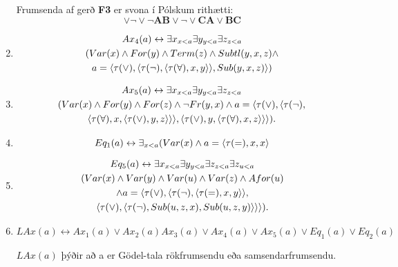 \documentclass[12pt]{book}
\newcommand{\bA}{\mathbf{A}}
\newcommand{\bB}{\mathbf{B}}
\newcommand{\bC}{\mathbf{C}}
\begin{document}
\begin{enumerate}[(1)]
\begin{ath}
  Frumsenda af gerð \textbf{F3} er svona í Pólskum rithætti:
   \[ \vee \lnot \vee \lnot \bA \bB \vee \lnot \vee \bC \bA \vee \bB \bC \]
\end{ath}


\item 
  \begin{gather*}
    Ax_4(a) \leftrightarrow \exists x_{x < a} \exists y_{y < a} \exists z_{z < a}\\
    ( Var(x) \wedge For(y) \wedge Term(z) \wedge Subtl(y,x,z) \wedge\\
    a = \langle\tau(\vee),\langle\tau(\lnot), \langle \tau(\forall),x,y\rangle\rangle, Sub(y,x,z)\rangle
    )
\end{gather*}

\item 
  \begin{gather*}
    Ax_5(a) \leftrightarrow \exists x_{x < a} \exists y_{y < a} \exists z_{z < a}\\
    ( Var(x) \wedge For(y) \wedge For(z) \wedge \lnot Fr(y,x) 
    \wedge a = \langle\tau(\vee), \langle\tau(\lnot),\\
        \langle\tau(\forall),x, \langle\tau(\vee),y,z\rangle\rangle\rangle, \langle\tau(\vee),y, \langle\tau(\forall),x,z\rangle\rangle\rangle).
\end{gather*}

\item  
\[ Eq_1(a) \leftrightarrow \exists_{x < a} (Var(x) \wedge a = \langle\tau(=),x,x\rangle \]

\item 
  \begin{gather*}
    Eq_5(a) \leftrightarrow \exists x_{x < a} \exists y_{y < a} \exists z_{z < a} \exists z_{u < a}\\
    (Var(x) \wedge Var(y) \wedge Var(u) \wedge Var(z) \wedge Afor(u) \\
    \wedge a = \langle\tau(\vee),\langle\tau(\lnot),\langle\tau(=),x,y\rangle\rangle,\\
      \langle\tau(\vee), \langle\tau(\lnot),Sub(u,z,x),Sub(u,z,y)\rangle\rangle\rangle).
  \end{gather*}



\item 

\[LAx(a) \leftrightarrow Ax_1(a) \vee Ax_2(a)  Ax_3(a) \vee Ax_4(a) \vee Ax_5(a) \vee Eq_1(a) \vee Eq_2(a) \]

\begin{ath}
  $LAx(a)$ þýðir að a er Gödel-tala rökfrumsendu eða samsendarfrumsendu.


\end{ath}
\end{enumerate}
\end{document}
